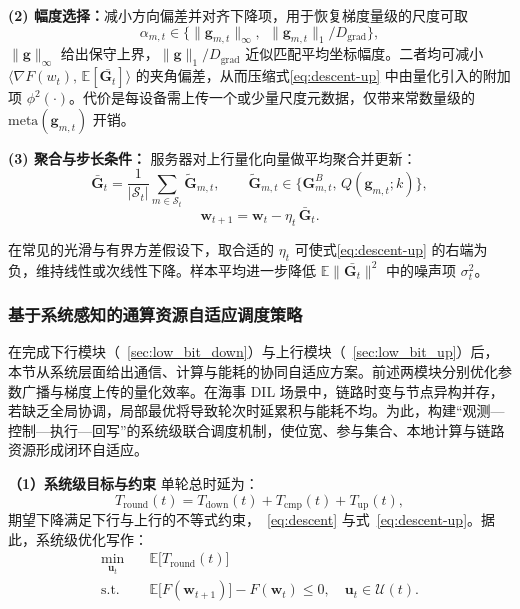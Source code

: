 \textbf{(2) 幅度选择：}减小方向偏差并对齐下降项，用于恢复梯度量级的尺度可取
\begin{equation}
	\label{eq:alpha-choices}
	\alpha_{m,t} \in
	\Big\{
	\|\mathbf{g}_{m,t}\|_\infty,\ \
	\|\mathbf{g}_{m,t}\|_1 / D_{\text{grad}}
	\Big\},
\end{equation}
$\|\mathbf{g}\|_\infty$ 给出保守上界，$\|\mathbf{g}\|_1/D_\text{grad}$ 近似匹配平均坐标幅度。二者均可减小
$\langle\nabla F(w_t),\,\mathbb E[\bar {\mathbf{G}_t}]\rangle$ 的夹角偏差，从而压缩式\eqref{eq:descent-up} 中由量化引入的附加项 $\phi^2(\cdot)$。代价是每设备需上传一个或少量尺度元数据，仅带来常数量级的 $\mathrm{meta}(\mathbf{g}_{m,t})$ 开销。

\textbf{(3) 聚合与步长条件：}
服务器对上行量化向量做平均聚合并更新：
\begin{equation}
	\label{eq:agg}
	\bar{\mathbf{G}}_t
	= \frac{1}{|\mathcal{S}_t|}
	\sum_{m \in \mathcal{S}_t} \widetilde{\mathbf{G}}_{m,t},\qquad
	\widetilde{\mathbf{G}}_{m,t} \in \big\{\mathbf{G}_{m,t}^{B},\, Q(\mathbf{g}_{m,t}; k)\big\},
\end{equation}
\begin{equation}
	\label{eq:update}
	\mathbf{w}_{t+1} = \mathbf{w}_t - \eta_t\,\bar{\mathbf{G}}_t.
\end{equation}


在常见的光滑与有界方差假设下，取合适的 $\eta_t$ 可使式\eqref{eq:descent-up} 的右端为负，维持线性或次线性下降。样本平均进一步降低 $\mathbb E\|\bar{ \mathbf{G}_t}\|^2$ 中的噪声项 $\sigma_t^2$。

\subsubsection{基于系统感知的通算资源自适应调度策略}\label{sec:resource_allocation_sys-awa}
\label{sec:adaptive_orchestration}
在完成下行模块（~\ref{sec:low_bit_down}）与上行模块（~\ref{sec:low_bit_up}）后，本节从系统层面给出通信、计算与能耗的协同自适应方案。前述两模块分别优化参数广播与梯度上传的量化效率。在海事 DIL 场景中，链路时变与节点异构并存，若缺乏全局协调，局部最优将导致轮次时延累积与能耗不均。为此，构建“观测—控制—执行—回写”的系统级联合调度机制，使位宽、参与集合、本地计算与链路资源形成闭环自适应。


\textbf{（1）系统级目标与约束}
单轮总时延为：
\begin{equation}
	T_{\mathrm{round}}(t)=T_{\mathrm{down}}(t)+T_{\mathrm{cmp}}(t)+T_{\mathrm{up}}(t),
\end{equation}
期望下降满足下行与上行的不等式约束，~\eqref{eq:descent} 与式~\eqref{eq:descent-up}。据此，系统级优化写作：
\begin{align}
	\label{eq:joint-opt}
	\min_{\mathbf{u}_t}\quad & \mathbb{E}\big[T_{\mathrm{round}}(t)\big] \nonumber \\
	\text{s.t.}\quad
	& \mathbb{E}\big[F(\mathbf{w}_{t+1})\big] - F(\mathbf{w}_t) \le 0,\quad
	\mathbf{u}_t \in \mathcal{U}(t).
\end{align}


